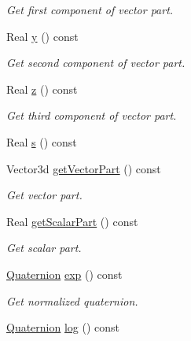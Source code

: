 \begin{DoxyCompactItemize}
\begin{DoxyCompactList}\small\item\em Get first component of vector part. \end{DoxyCompactList}\item 
Real \hyperlink{classostk_1_1math_1_1geom_1_1d3_1_1trf_1_1rot_1_1_quaternion_a7b480255c61d24f59446e0f1664ca070}{y} () const
\begin{DoxyCompactList}\small\item\em Get second component of vector part. \end{DoxyCompactList}\item 
Real \hyperlink{classostk_1_1math_1_1geom_1_1d3_1_1trf_1_1rot_1_1_quaternion_a0bb2ccff6bafbafc61232574584fb65d}{z} () const
\begin{DoxyCompactList}\small\item\em Get third component of vector part. \end{DoxyCompactList}\item 
Real \hyperlink{classostk_1_1math_1_1geom_1_1d3_1_1trf_1_1rot_1_1_quaternion_ab53045f72736712ac53e4def941a196a}{s} () const
\item 
Vector3d \hyperlink{classostk_1_1math_1_1geom_1_1d3_1_1trf_1_1rot_1_1_quaternion_a88ec3b0a13fe2f708eb1955a97866a36}{get\+Vector\+Part} () const
\begin{DoxyCompactList}\small\item\em Get vector part. \end{DoxyCompactList}\item 
Real \hyperlink{classostk_1_1math_1_1geom_1_1d3_1_1trf_1_1rot_1_1_quaternion_a6cb0e23d41afd8477e97fa764d416e1e}{get\+Scalar\+Part} () const
\begin{DoxyCompactList}\small\item\em Get scalar part. \end{DoxyCompactList}\item 
\hyperlink{classostk_1_1math_1_1geom_1_1d3_1_1trf_1_1rot_1_1_quaternion}{Quaternion} \hyperlink{classostk_1_1math_1_1geom_1_1d3_1_1trf_1_1rot_1_1_quaternion_ab52abec08a04aa42646b2f418b7ba964}{exp} () const
\begin{DoxyCompactList}\small\item\em Get normalized quaternion. \end{DoxyCompactList}\item 
\hyperlink{classostk_1_1math_1_1geom_1_1d3_1_1trf_1_1rot_1_1_quaternion}{Quaternion} \hyperlink{classostk_1_1math_1_1geom_1_1d3_1_1trf_1_1rot_1_1_quaternion_a0ced27267be4ede14ab115f2febc55a3}{log} () const

\end{DoxyCompactItemize}
